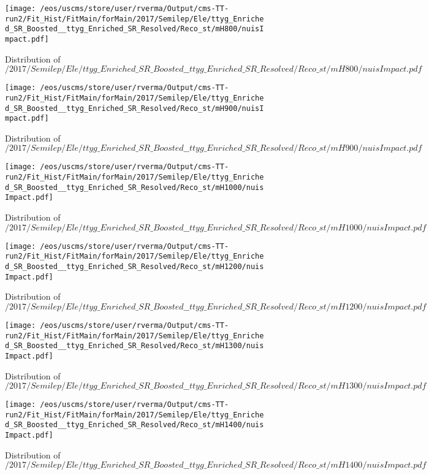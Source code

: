 \begin{figure}
\centering
\texttt{[image: /eos/uscms/store/user/rverma/Output/cms-TT-run2/Fit\_Hist/FitMain/forMain/2017/Semilep/Ele/ttyg\_Enriched\_SR\_Boosted\_\_ttyg\_Enriched\_SR\_Resolved/Reco\_st/mH800/nuisImpact.pdf]}
\caption{Distribution of $/2017/Semilep/Ele/ttyg\_Enriched\_SR\_Boosted\_\_ttyg\_Enriched\_SR\_Resolved/Reco\_st/mH800/nuisImpact.pdf$}
\end{figure}

\begin{figure}
\centering
\texttt{[image: /eos/uscms/store/user/rverma/Output/cms-TT-run2/Fit\_Hist/FitMain/forMain/2017/Semilep/Ele/ttyg\_Enriched\_SR\_Boosted\_\_ttyg\_Enriched\_SR\_Resolved/Reco\_st/mH900/nuisImpact.pdf]}
\caption{Distribution of $/2017/Semilep/Ele/ttyg\_Enriched\_SR\_Boosted\_\_ttyg\_Enriched\_SR\_Resolved/Reco\_st/mH900/nuisImpact.pdf$}
\end{figure}

\begin{figure}
\centering
\texttt{[image: /eos/uscms/store/user/rverma/Output/cms-TT-run2/Fit\_Hist/FitMain/forMain/2017/Semilep/Ele/ttyg\_Enriched\_SR\_Boosted\_\_ttyg\_Enriched\_SR\_Resolved/Reco\_st/mH1000/nuisImpact.pdf]}
\caption{Distribution of $/2017/Semilep/Ele/ttyg\_Enriched\_SR\_Boosted\_\_ttyg\_Enriched\_SR\_Resolved/Reco\_st/mH1000/nuisImpact.pdf$}
\end{figure}

\begin{figure}
\centering
\texttt{[image: /eos/uscms/store/user/rverma/Output/cms-TT-run2/Fit\_Hist/FitMain/forMain/2017/Semilep/Ele/ttyg\_Enriched\_SR\_Boosted\_\_ttyg\_Enriched\_SR\_Resolved/Reco\_st/mH1200/nuisImpact.pdf]}
\caption{Distribution of $/2017/Semilep/Ele/ttyg\_Enriched\_SR\_Boosted\_\_ttyg\_Enriched\_SR\_Resolved/Reco\_st/mH1200/nuisImpact.pdf$}
\end{figure}

\begin{figure}
\centering
\texttt{[image: /eos/uscms/store/user/rverma/Output/cms-TT-run2/Fit\_Hist/FitMain/forMain/2017/Semilep/Ele/ttyg\_Enriched\_SR\_Boosted\_\_ttyg\_Enriched\_SR\_Resolved/Reco\_st/mH1300/nuisImpact.pdf]}
\caption{Distribution of $/2017/Semilep/Ele/ttyg\_Enriched\_SR\_Boosted\_\_ttyg\_Enriched\_SR\_Resolved/Reco\_st/mH1300/nuisImpact.pdf$}
\end{figure}

\begin{figure}
\centering
\texttt{[image: /eos/uscms/store/user/rverma/Output/cms-TT-run2/Fit\_Hist/FitMain/forMain/2017/Semilep/Ele/ttyg\_Enriched\_SR\_Boosted\_\_ttyg\_Enriched\_SR\_Resolved/Reco\_st/mH1400/nuisImpact.pdf]}
\caption{Distribution of $/2017/Semilep/Ele/ttyg\_Enriched\_SR\_Boosted\_\_ttyg\_Enriched\_SR\_Resolved/Reco\_st/mH1400/nuisImpact.pdf$}
\end{figure}

